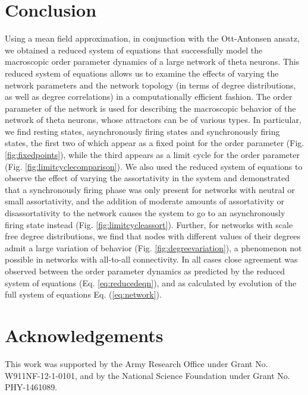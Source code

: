 \documentclass[%
 aip,
 sd,%
 amsmath,amssymb,
 reprint,%
]{revtex4-1}
\begin{document}
\section{Conclusion}\label{sec:conclusion}
Using a mean field approximation, in conjunction with the Ott-Antonsen ansatz, we obtained a reduced system of equations that successfully model the macroscopic order parameter dynamics of a large network of theta neurons. This reduced system of equations allows us to examine the effects of varying the network parameters and the network topology (in terms of degree distributions, as well as degree correlations) in a computationally efficient fashion. The order parameter of the network is used for describing the macroscopic behavior of the network of theta neurons, whose attractors can be of various types. In particular, we find resting states, asynchronously firing states and synchronously firing states, the first two of which appear as a fixed point for the order parameter (Fig. \ref{fig:fixedpoints}), while the third appears as a limit cycle for the order parameter (Fig. \ref{fig:limitcyclecomparison}). We also used the reduced system of equations to observe the effect of varying the assortativity in the system and demonstrated that a synchronously firing phase was only present for networks with neutral or small assortativity, and the addition of moderate amounts of assortativity or disassortativity to the network causes the system to go to an asynchronously firing state instead (Fig. \ref{fig:limitcycleassort}). Further, for networks with scale free degree distributions, we find that nodes with different values of their degrees admit a large variation of behavior (Fig. \ref{fig:degreevariation}), a phenomenon not possible in networks with all-to-all connectivity. In all cases close agreement was observed between the order parameter dynamics as predicted by the reduced system of equations (Eq. \ref{eq:reducedeqn}), and as calculated by evolution of the full system of equations Eq. (\ref{eq:network}).



\section*{Acknowledgements}

This work was supported by the Army Research Office under Grant No. W911NF-12-1-0101, and by the National Science Foundation under Grant No. PHY-1461089.



\end{document}
